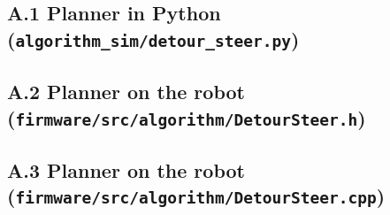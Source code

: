\documentclass[11pt,a4paper]{article}
\begin{document}
\clearpage
\subsection*{A.1 Planner in Python (\texttt{algorithm\_sim/detour\_steer.py})}


\subsection*{A.2 Planner on the robot (\texttt{firmware/src/algorithm/DetourSteer.h})}


\subsection*{A.3 Planner on the robot (\texttt{firmware/src/algorithm/DetourSteer.cpp})}

\end{document}
